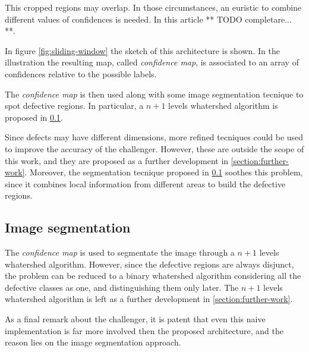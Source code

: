        \par{
            This cropped regions may overlap. In those circumstances, an euristic to combine different values of confidences is needed. In this article ** TODO completare... **.
        }
        \par{
            In figure \ref{fig:sliding-window} the sketch of this architecture is shown. In the illustration the resulting map, called \emph{confidence map}, is associated to an array of confidences relative to the possible labels. 
        }
        \par{
            The \emph{confidence map} is then used along with some image segmentation tecnique to spot defective regions. In particular, a $n+1$ levels whatershed algorithm is proposed in \ref{section:challenger:image-segmentation}.
        }
        \par{
            Since defects may have different dimensions, more refined tecniques could be used to improve the accuracy of the challenger. However, these are outside the scope of this work, and they are proposed as a further development in \ref{section:further-work}. Moreover, the segmentation tecnique proposed in \ref{section:challenger:image-segmentation} soothes this problem, since it combines local information from different areas to build the defective regions.
        }
    \subsection{Image segmentation}\label{section:challenger:image-segmentation}
        \par{
            The \emph{confidence map} is used to segmentate the image through a $n+1$ levels whatershed algorithm. However, since the defective regions are always disjunct, the problem can be reduced to a binary whatershed algorithm \cite{ieee:87344} considering all the defective classes as one, and distinguishing them only later. The $n+1$ levels whatershed algorithm is left as a further development in \ref{section:further-work}.
        }
        \par{
            As a final remark about the challenger, it is patent that even this naive implementation is far more involved then the proposed architecture, and the reason lies on the image segmentation approach.
        }